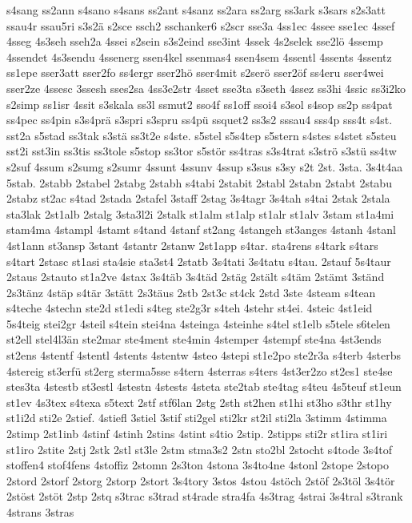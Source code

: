 {s4sang
ss2ann
s4sano
s4sans
ss2ant
s4sanz
ss2ara
ss2arg
ss3ark
s3sars
s2s3att
ssau4r
ssau5ri
s3s2ä
s2sce
ssch2
sschanker6
s2scr
sse3a
4ss1ec
4ssee
sse1ec
4ssef
4sseg
4s3seh
sseh2a
4ssei
s2sein
s3s2eind
sse3int
4ssek
4s2selek
sse2lö
4ssemp
4ssendet
4s3sendu
4ssenerg
ssen4kel
ssenmas4
ssen4sem
4ssentl
4ssents
4ssentz
ss1epe
sser3att
sser2fo
ss4ergr
sser2hö
sser4mit
s2serö
sser2öf
ss4eru
sser4wei
sser2ze
4ssesc
3ssesh
sses2sa
4ss3e2str
4sset
sse3ta
s3seth
4ssez
ss3hi
4ssic
ss3i2ko
s2simp
ss1isr
4ssit
s3skala
ss3l
ssmut2
sso4f
ss1off
ssoi4
s3sol
s4sop
ss2p
ss4pat
ss4pec
ss4pin
s3s4prä
s3spri
s3spru
ss4pü
ssquet2
ss3s2
sssau4
sss4p
sss4t
s4st.
sst2a
s5stad
ss3tak
s3stä
ss3t2e
s4ste.
s5stel
s5s4tep
s5stern
s4stes
s4stet
s5steu
sst2i
sst3in
ss3tis
ss3tole
s5stop
ss3tor
s5stör
ss4tras
s3s4trat
s3strö
s3stü
ss4tw
s2suf
4ssum
s2sumg
s2sumr
4ssunt
4ssunv
4ssup
s3sus
s3sy
s2t
2st.
3sta.
3s4t4aa
5stab.
2stabb
2stabel
2stabg
2stabh
s4tabi
2stabit
2stabl
2stabn
2stabt
2stabu
2stabz
st2ac
s4tad
2stada
2stafel
3staff
2stag
3s4tagr
3s4tah
s4tai
2stak
2stala
sta3lak
2st1alb
2stalg
3sta3l2i
2stalk
st1alm
st1alp
st1alr
st1alv
3stam
st1a4mi
stam4ma
4stampl
4stamt
s4tand
4stanf
st2ang
4stangeh
st3anges
4stanh
4stanl
4st1ann
st3ansp
3stant
4stantr
2stanw
2st1app
s4tar.
sta4rens
s4tark
s4tars
s4tart
2stasc
st1asi
sta4sie
sta3st4
2statb
3s4tati
3s4tatu
s4tau.
2stauf
5s4taur
2staus
2stauto
st1a2ve
4stax
3s4täb
3s4täd
2stäg
2stält
s4täm
2stämt
3ständ
2s3tänz
4stäp
s4tär
3stätt
2s3täus
2stb
2st3c
st4ck
2std
3ste
4steam
s4tean
s4teche
4stechn
ste2d
st1edi
s4teg
ste2g3r
s4teh
4stehr
st4ei.
4steic
4st1eid
5s4teig
stei2gr
4steil
s4tein
stei4na
4steinga
4steinhe
s4tel
st1elb
s5tele
s6telen
st2ell
stel4l3än
ste2mar
ste4ment
ste4min
4stemper
4stempf
ste4na
4st3ends
st2ens
4stentf
4stentl
4stents
4stentw
4steo
4stepi
st1e2po
ste2r3a
s4terb
4sterbs
4stereig
st3erfü
st2erg
sterma5sse
s4tern
4sterras
s4ters
4st3er2zo
st2es1
ste4se
stes3ta
4stestb
st3estl
4stestn
4stests
4steta
ste2tab
ste4tag
s4teu
4s5teuf
st1eun
st1ev
4s3tex
s4texa
s5text
2stf
stf6lan
2stg
2sth
st2hen
st1hi
st3ho
s3thr
st1hy
st1i2d
sti2e
2stief.
4stiefl
3stiel
3stif
sti2gel
sti2kr
st2il
sti2la
3stimm
4stimma
2stimp
2st1inb
4stinf
4stinh
2stins
4stint
s4tio
2stip.
2stipps
sti2r
st1ira
st1iri
st1iro
2stite
2stj
2stk
2stl
st3le
2stm
stma3s2
2stn
sto2bl
2stocht
s4tode
3s4tof
stoffen4
stof4fens
4stoffiz
2stomn
2s3ton
4stona
3s4to4ne
4stonl
2stope
2stopo
2stord
2storf
2storg
2storp
2stort
3s4tory
3stos
4stou
4stöch
2stöf
2s3töl
3s4tör
2stöst
2stöt
2stp
2stq
s3trac
s3trad
st4rade
stra4fa
4s3trag
4strai
3s4tral
s3trank
4strans
3stras
}
